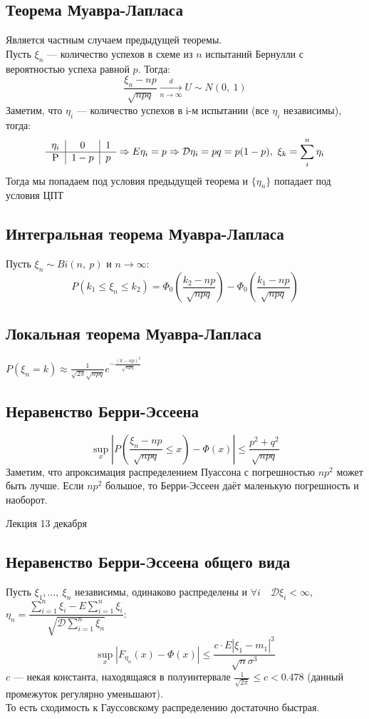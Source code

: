 \documentclass[12pt, a4paper]{article}
\begin{document}
    \subsection*{Теорема Муавра-Лапласа}
    Является частным случаем предыдущей теоремы.\\
    Пусть $\xi_n$ --- количество успехов в схеме из $n$ испытаний Бернулли с вероятностью успеха равной $p$. Тогда:
    \[\frac{\xi_n - np}{\sqrt{npq}} \xrightarrow[n\to \infty]{d} U\sim N(0,\ 1)\]
    Заметим, что $\eta_i$ --- количество успехов в i-м испытании (все $\eta_i$ независимы), тогда:
    \[\begin{tabular}{c|c|c}
        $\eta_i$ & 0 & 1\\
        \hline
        P & $1-p$ & $p$
    \end{tabular}\Rightarrow E\eta_i = p\Rightarrow \mathcal{D}\eta_i = pq = p(1 - p),\ \xi_k = \sum_i^n \eta_i\]
    Тогда мы попадаем под условия предыдущей теорема и $\{\eta_n\}$ попадает под условия ЦПТ
    \subsection*{Интегральная теорема Муавра-Лапласа}
    Пусть $\xi_n \sim Bi(n,\ p)$ и $n\to \infty$:
    \[P(k_1 \leq \xi_n\leq k_2) = \Phi_0\left(\frac{k_2 - np}{\sqrt{npq}}\right) - \Phi_0\left(\frac{k_1 - np}{\sqrt{npq}}\right)\]
    \subsection*{Локальная теорема Муавра-Лапласа}
    $P(\xi_n = k)\approx \frac{1}{\sqrt{2\pi}\sqrt{npq}}e^{-\frac{(k - np)^2}{\sqrt{npq}}}$
    \subsection*{Неравенство  Берри-Эссеена}
    \[\sup\limits_x \left| P\left( \frac{\xi_n - np}{\sqrt{npq}} \leq x\right) - \Phi(x)\right| \leq \frac{p^2 + q^2}{\sqrt{npq}}\]
    Заметим, что апроксимация распределением Пуассона с погрешностью $np^2$ может быть лучше. Если $np^2$ большое, то Берри-Эссеен даёт маленькую погрешность и наоборот.
    \begin{center}
        Лекция 13 декабря
    \end{center}
    \subsection*{Неравенство Берри-Эссеена общего вида}
    Пусть $\xi_1,\dots,\ \xi_n$ независимы, одинаково распределены и $\forall i\quad \mathcal{D}\xi_i < \infty$, $\eta_n = \dfrac{\sum_{i = 1}^{n} \xi_i - E\sum_{i = 1}^{n} \xi_i}{\sqrt{\mathcal{D}\sum_{i=1}^{n}\xi_n}}$:
    \[\sup_x \left| F_{\eta_n} (x) - \Phi(x) \right| \leq \frac{c\cdot E|\xi_1 - m_1|^3}{\sqrt{n}\sigma^3}\]
    $c$ --- некая константа, находящаяся в полуинтервале $\frac{1}{\sqrt{2\pi}} \leq c < 0.478$ (данный промежуток регулярно уменьшают).\\
    То есть сходимость к Гауссовскому распределению достаточно быстрая.
\end{document}
